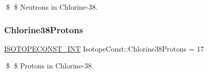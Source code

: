 \$ \$ Neutrons in Chlorine-\/38. \mbox{\label{group___isotope_const-_chlorine-_cl38_gad76c2fd2ee6caf5a2a3b189921626380}} 
\subsubsection{\texorpdfstring{Chlorine38\+Protons}{Chlorine38Protons}}
{\footnotesize\ttfamily \mbox{\hyperlink{group___isotope_const-_macros_ga5f18360b3e99483a35c32d789e62621c}{I\+S\+O\+T\+O\+P\+E\+C\+O\+N\+S\+T\+\_\+\+I\+NT}} Isotope\+Const\+::\+Chlorine38\+Protons = 17}

\$ \$ Protons in Chlorine-\/38. 